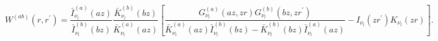 \begin{equation}
W^{(ab)}(r,r^{\prime })=\frac{\bar{I}_{\nu _{l}}^{(a)}(az)}{\bar{I}_{\nu
_{l}}^{(b)}(bz)}\frac{\bar{K}_{\nu _{l}}^{(b)}(bz)}{\bar{K}_{\nu
_{l}}^{(a)}(az)}\left[ \frac{G_{\nu _{l}}^{(a)}(az,zr)G_{\nu
_{l}}^{(b)}(bz,zr^{\prime })}{\bar{K}_{\nu _{l}}^{(a)}(az)\bar{I}_{\nu
_{l}}^{(b)}(bz)-\bar{K}_{\nu _{l}}^{(b)}(bz)\bar{I}_{\nu _{l}}^{(a)}(az)}%
-I_{\nu _{l}}(zr^{\prime })K_{\nu _{l}}(zr)\right] .  \label{Wrr}
\end{equation}

